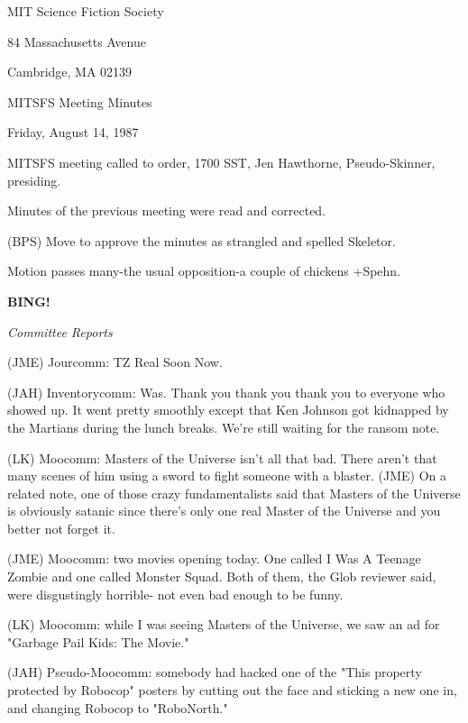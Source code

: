 \documentclass[12pt]{article}
\newcommand{\bing}{{\bf BING!} }
\newcommand{\goto}[1]{\bing \vskip 12pt \centerline{{\em{#1}}}}
\begin{document}
\begin{center}

MIT Science Fiction Society 

84 Massachusetts Avenue

Cambridge, MA 02139

\vspace{12pt}

MITSFS Meeting Minutes 

Friday, August 14, 1987

\end{center}
 
\vspace{18pt}

\setlength{\parskip}{6pt}

\noindent
MITSFS meeting called to order, 1700 SST,
Jen Hawthorne, Pseudo-Skinner, presiding.

Minutes of the previous meeting were read and corrected.

(BPS) Move to approve the minutes as strangled and spelled Skeletor.

Motion passes many-the usual opposition-a couple of chickens +Spehn.

\goto{Committee Reports}

(JME) Jourcomm: TZ Real Soon Now.

(JAH) Inventorycomm: Was. Thank you thank you thank you to everyone who showed up. It went  pretty smoothly except that Ken Johnson got kidnapped by the Martians during the lunch breaks. We're still waiting for the ransom note.

(LK) Moocomm: Masters of the Universe isn't all that bad. There aren't that many scenes of him using a sword to fight someone with a blaster. (JME) On a related note, one of those crazy fundamentalists said that Masters of the Universe is obviously satanic since there's only one real Master of the Universe and you better not forget it.

(JME) Moocomm: two movies opening today. One called I Was A Teenage Zombie and one called Monster Squad. Both of them, the Glob reviewer said, were disgustingly horrible- not even bad enough to be funny.

(LK) Moocomm: while I was seeing Masters of the Universe, we saw an ad for "Garbage Pail Kids: The Movie."

(JAH) Pseudo-Moocomm: somebody had hacked one of the "This property protected by Robocop" posters by cutting out the face and sticking a new one in, and changing Robocop to "RoboNorth."
\end{document}
